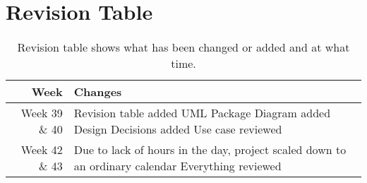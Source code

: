 \section{Revision Table}
\begin{table*}[ht]\centering
  \begin{tabularx}{\textwidth}{@{}rX@{}}
    \toprule
    \textbf{Week} & \textbf{Changes} \\\hline
    Week 39 \& 40 & Revision table added\newline  
		    		UML Package Diagram added\newline
		    		Design Decisions added\newline
		    		Use case reviewed\\\hline
	Week 42 \& 43 & Due to lack of hours in the day, project scaled down to an ordinary calendar \newline
					Everything reviewed\\
    \bottomrule
  \end{tabularx}
  \caption{Revision table shows what has been changed or added and at what time.}
\end{table*}
\newpage